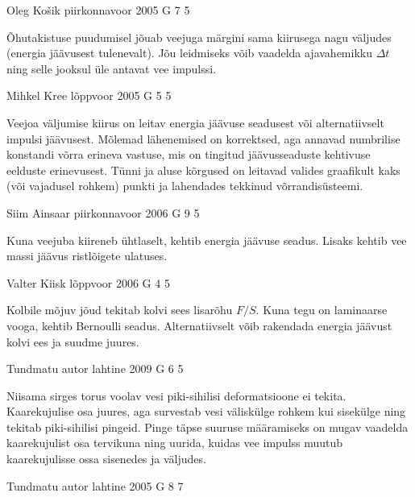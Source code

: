 \documentclass[11pt]{article}
\begin{document}
{%
{Oleg Košik} %
{piirkonnavoor} %
{2005} %
{G 7} %
{5} %
{

\ifHint
Õhutakistuse puudumisel jõuab veejuga märgini sama kiirusega nagu väljudes (energia jäävusest tulenevalt). Jõu leidmiseks võib vaadelda ajavahemikku $\Delta t$ ning selle jooksul üle antavat vee impulssi.
\fi
}

{Mihkel Kree} %
{lõppvoor} %
{2005} %
{G 5} %
{5} %
{

\ifHint
Veejoa väljumise kiirus on leitav energia jäävuse seadusest või alternatiivselt impulsi jäävusest. Mõlemad lähenemised on korrektsed, aga annavad numbrilise konstandi võrra erineva vastuse, mis on tingitud jäävusseaduste kehtivuse eelduste erinevusest. Tünni ja aluse kõrgused on leitavad valides graafikult kaks (või vajadusel rohkem) punkti ja lahendades tekkinud võrrandisüsteemi.
\fi
}

{Siim Ainsaar} %
{piirkonnavoor} %
{2006} %
{G 9} %
{5} %
{

\ifHint
Kuna veejuba kiireneb ühtlaselt, kehtib energia jäävuse seadus. Lisaks kehtib vee massi jäävus ristlõigete ulatuses.
\fi
}

{Valter Kiisk} %
{lõppvoor} %
{2006} %
{G 4} %
{5} %
{

\ifHint
Kolbile mõjuv jõud tekitab kolvi sees lisarõhu $F/S$. Kuna tegu on laminaarse vooga, kehtib Bernoulli seadus. Alternatiivselt võib rakendada energia jäävust kolvi ees ja suudme juures.
\fi
}

{Tundmatu autor} %
{lahtine} %
{2009} %
{G 6} %
{5} %
{

\ifHint
Niisama sirges torus voolav vesi piki-sihilisi deformatsioone ei tekita. Kaarekujulise osa juures, aga survestab vesi väliskülge rohkem kui sisekülge ning tekitab piki-sihilisi pingeid. Pinge täpse suuruse määramiseks on mugav vaadelda kaarekujulist osa tervikuna ning uurida, kuidas vee impulss muutub kaarekujulisse ossa sisenedes ja väljudes.
\fi
}

{Tundmatu autor} %
{lahtine} %
{2005} %
{G 8} %
{7} %
{

}}
\end{document}

